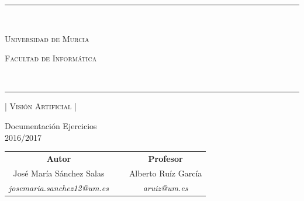 \documentclass[a4paper,10pt,titlepage,oneside,openright]{book}
\begin{document}
\begin{center}
\rule{150mm}{0.1mm} \\
\vspace{5mm}
\begin{Huge}
 \textsc{Universidad de Murcia}\\ \vspace{10mm}
\end{Huge}
\begin{huge}
 \textsc{Facultad de Informática}
\end{huge}
\vspace{5mm} \\
\rule{150mm}{0.5mm}

\vspace{10mm}

\begin{Huge}
  \textsc{| Visión Artificial |} \\ \vspace{10mm}
\end{Huge}

\begin{LARGE}
 Documentación Ejercicios\\ \vspace{3mm}
 {\large 2016/2017}
\end{LARGE}

\vspace{25mm}

\begin{Large}
\begin{center}
\begin{tabular}{ccc}
\textbf{Autor} & ~ & \textbf{Profesor}\\
José María Sánchez Salas & ~ & Alberto Ruíz García\\
\textit{josemaria.sanchez12@um.es} & ~ & \textit{aruiz@um.es}
\end{tabular}
\end{center}
\end{Large}
\end{center}
\newpage
\thispagestyle{empty}
\section*{}
\newpage

\thispagestyle{empty}

\tableofcontents
{}

\newpage
\thispagestyle{empty}
\end{document}
